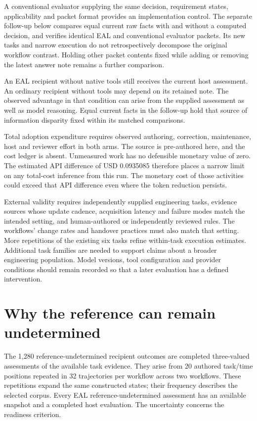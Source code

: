 \documentclass[preprint,11pt]{elsarticle}
\begin{document}
A conventional evaluator supplying the same decision, requirement
states, applicability and packet format provides an implementation
control. The separate follow-up below compares equal current raw facts
with and without a computed decision, and verifies identical EAL and
conventional evaluator packets. Its new tasks and narrow execution do
not retrospectively decompose the original workflow contrast. Holding
other packet contents fixed while adding or removing the latest answer
note remains a further comparison.

An EAL recipient without native tools still receives the current host
assessment. An ordinary recipient without tools may depend on its
retained note. The observed advantage in that condition can arise from
the supplied assessment as well as model reasoning. Equal current facts
in the follow-up hold that source of information disparity fixed within
its matched comparisons.

Total adoption expenditure requires observed authoring, correction,
maintenance, host and reviewer effort in both arms. The source is
pre-authored here, and the cost ledger is absent. Unmeasured work has no
defensible monetary value of zero. The estimated API difference of USD
0.0935085 therefore places a narrow limit on any total-cost inference
from this run. The monetary cost of those activities could exceed that
API difference even where the token reduction persists.

External validity requires independently supplied engineering tasks,
evidence sources whose update cadence, acquisition latency and failure
modes match the intended setting, and human-authored or independently
reviewed rules. The workflows' change rates and handover practices must
also match that setting. More repetitions of the existing six tasks
refine within-task execution estimates. Additional task families are
needed to support claims about a broader engineering population. Model
versions, tool configuration and provider conditions should remain
recorded so that a later evaluation has a defined intervention.

\FloatBarrier

\hypertarget{why-the-reference-can-remain-undetermined}{%
\section{Why the reference can remain
undetermined}\label{why-the-reference-can-remain-undetermined}}

The 1,280 reference-undetermined recipient outcomes are completed
three-valued assessments of the available task evidence. They arise from
20 authored task/time positions repeated in 32 trajectories per workflow
across two workflows. These repetitions expand the same constructed
states; their frequency describes the selected corpus. Every EAL
reference-undetermined assessment has an available snapshot and a
completed host evaluation. The uncertainty concerns the readiness
criterion.
\end{document}
